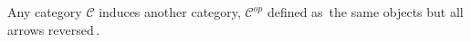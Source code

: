 
Any category $\mathcal{C}$ induces another category, $\mathcal{C}^{op}$ defined as \,the same objects but all arrows reversed\,.
